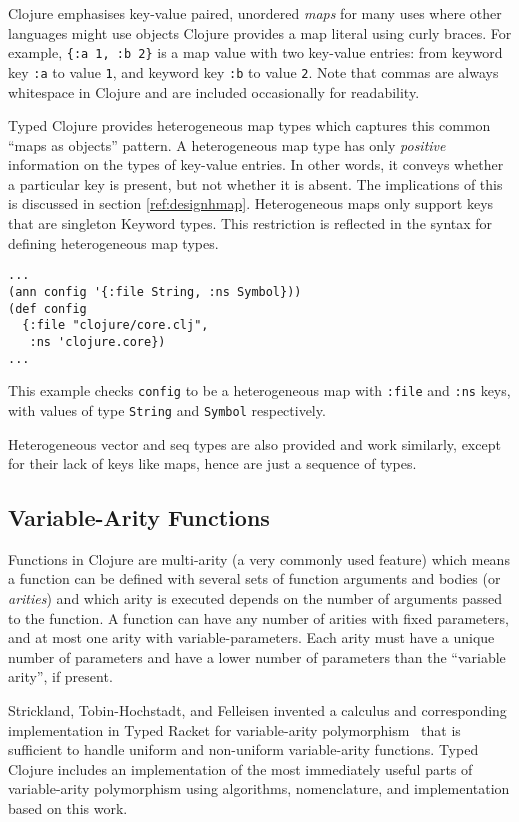 Clojure emphasises key-value paired, unordered \emph{maps} for many uses where other languages might use objects
Clojure provides a map literal using curly braces. For example,
\lstinline|{:a 1, :b 2}| is a map value with two key-value entries: from keyword key \lstinline|:a|
to value \lstinline|1|, and keyword key \lstinline|:b| to value \lstinline|2|. Note that commas are always
whitespace in Clojure and are included occasionally for readability.

Typed Clojure provides heterogeneous map types which captures this common
``maps as objects'' pattern. A heterogeneous map type has only \emph{positive}
information on the types of key-value entries. In other words, it conveys
whether a particular key is present, but not whether it is absent.
The implications of this is discussed in section \ref{ref:designhmap}.
Heterogeneous maps only support keys that are singleton Keyword types. This restriction is reflected
in the syntax for defining heterogeneous map types.

\begin{lstlisting}[caption=Heterogeneous map types in Typed Clojure]
...
(ann config '{:file String, :ns Symbol}))
(def config
  {:file "clojure/core.clj",
   :ns 'clojure.core})
...
\end{lstlisting}

This example checks \lstinline|config| to be a heterogeneous map
with \lstinline|:file| and \lstinline|:ns| keys, with values of
type \lstinline|String| and \lstinline|Symbol| respectively.

Heterogeneous vector and seq types are also provided and work similarly,
except for their lack of keys like maps, hence are just a sequence of types.

\subsection{Variable-Arity Functions}

Functions in Clojure are multi-arity (a very commonly used feature) which means a function
can be defined with several sets of function arguments and bodies (or \emph{arities})
and which arity is executed depends on the number of arguments passed
to the function. A function can have any number of arities with fixed parameters, and at most one arity with
variable-parameters. Each arity must have a unique number of
parameters and have a lower number of parameters than the ``variable arity'', if present.

Strickland, Tobin-Hochstadt, and Felleisen invented a calculus and corresponding
implementation in Typed Racket for variable-arity polymorphism~\cite{STF09}
that is sufficient to handle uniform and non-uniform variable-arity functions.
Typed Clojure includes an implementation of the most immediately useful parts of variable-arity
polymorphism using algorithms, nomenclature, and implementation based on this work.

